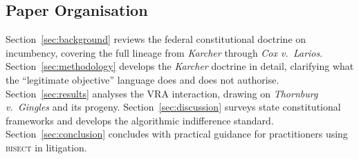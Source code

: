 \subsection{Paper Organisation}

Section~\ref{sec:background} reviews the federal constitutional doctrine on
incumbency, covering the full lineage from \textit{Karcher} through \textit{Cox v.\
Larios}. Section~\ref{sec:methodology} develops the \textit{Karcher} doctrine in
detail, clarifying what the ``legitimate objective'' language does and does not
authorise. Section~\ref{sec:results} analyses the VRA interaction, drawing on
\textit{Thornburg v.\ Gingles} and its progeny. Section~\ref{sec:discussion}
surveys state constitutional frameworks and develops the algorithmic indifference
standard. Section~\ref{sec:conclusion} concludes with practical guidance for
practitioners using \textsc{bisect} in litigation.
